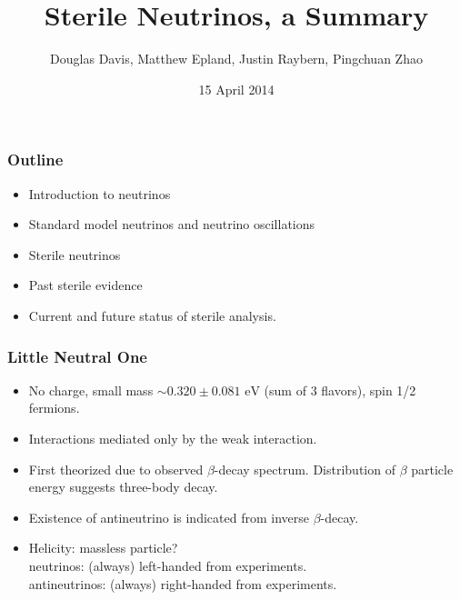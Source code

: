 \documentclass[mathserif,18pt,xcolor=table]{beamer}
\title[PHY 505 Project 3]{Sterile Neutrinos, a Summary}
\author[DD, ME, JR, PZ]{{\small Douglas Davis, Matthew Epland, Justin Raybern, Pingchuan Zhao}}
\institute{\it{Duke University} \\ \mbox{} \\ \mbox{} \\ \pgfuseimage{dukelogo}}
\date[15 April 2014]{15 April 2014}
\begin{document}
\beamertemplateballitem
\frame{\titlepage}

\begin{frame}
  \frametitle{Outline}
  \begin{itemize}
  \item Introduction to neutrinos
  \item Standard model neutrinos and neutrino oscillations
  \item Sterile neutrinos
  \item Past sterile evidence
  \item Current and future status of sterile analysis.
  \end{itemize}
\end{frame}

\begin{frame}
  \frametitle{Little Neutral One}
  \begin{itemize}
  \item No charge, small mass $\sim 0.320 \pm 0.081 \text{ eV}$ (sum of 3 flavors), spin 1/2 fermions.
  \item Interactions mediated only by the weak interaction.
  \item First theorized due to observed $\beta$-decay spectrum. Distribution of $\beta$ particle energy suggests three-body decay.
  \item Existence of antineutrino is indicated from inverse $\beta$-decay.
  \item Helicity: massless particle? \\
    neutrinos: (always) left-handed from experiments.\\
    antineutrinos: (always) right-handed from experiments.
  \end{itemize}
\end{frame}
\end{document}
